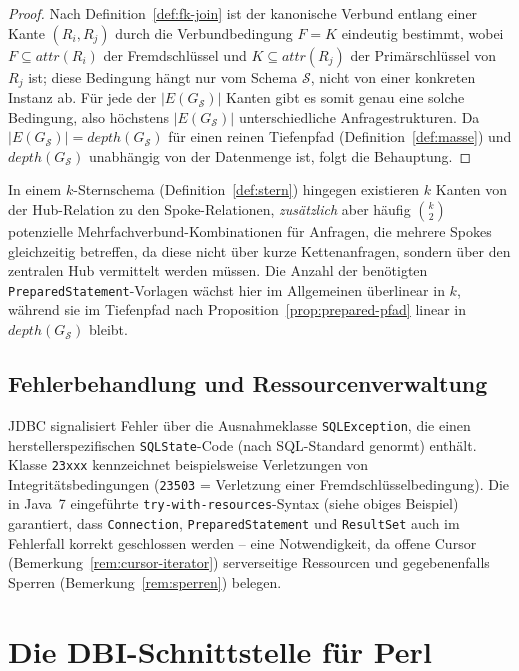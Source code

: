 ﻿\documentclass[a4paper,12pt]{report}
\theoremstyle{definition}
\theoremstyle{remark}
\newcommand{\att}{\mathit{attr}}
\newcommand{\depth}{\mathit{depth}}
\begin{document}
\begin{proof}
Nach Definition~\ref{def:fk-join} ist der kanonische Verbund entlang
einer Kante $(R_i,R_j)$ durch die Verbundbedingung $F=K$ eindeutig
bestimmt, wobei $F\subseteq\att(R_i)$ der Fremdschlüssel und
$K\subseteq\att(R_j)$ der Primärschlüssel von $R_j$ ist; diese
Bedingung hängt nur vom Schema $\mathcal{S}$, nicht von einer
konkreten Instanz ab. Für jede der $|E(G_{\mathcal{S}})|$ Kanten gibt
es somit genau eine solche Bedingung, also höchstens
$|E(G_{\mathcal{S}})|$ unterschiedliche Anfragestrukturen. Da
$|E(G_{\mathcal{S}})| = \depth(G_{\mathcal{S}})$ für einen reinen
Tiefenpfad (Definition~\ref{def:masse}) und
$\depth(G_{\mathcal{S}})$ unabhängig von der Datenmenge ist, folgt die
Behauptung. \qedhere
\end{proof}

In einem $k$-Sternschema (Definition~\ref{def:stern}) hingegen
existieren $k$ Kanten von der Hub-Relation zu den Spoke-Relationen,
\emph{zusätzlich} aber häufig $\binom{k}{2}$ potenzielle
Mehrfachverbund-Kombinationen für Anfragen, die mehrere Spokes
gleichzeitig betreffen, da diese nicht über kurze Kettenanfragen,
sondern über den zentralen Hub vermittelt werden müssen. Die Anzahl
der benötigten \texttt{PreparedStatement}-Vorlagen wächst hier im
Allgemeinen überlinear in $k$, während sie im Tiefenpfad nach
Proposition~\ref{prop:prepared-pfad} linear in $\depth(G_{\mathcal{S}})$
bleibt.

\subsection{Fehlerbehandlung und Ressourcenverwaltung}

JDBC signalisiert Fehler über die Ausnahmeklasse
\texttt{SQLException}, die einen herstellerspezifischen
\texttt{SQLState}-Code (nach SQL-Standard genormt) enthält. Klasse
\texttt{23xxx} kennzeichnet beispielsweise Verletzungen von
Integritätsbedingungen (\texttt{23503} = Verletzung einer
Fremdschlüsselbedingung). Die in Java~7 eingeführte
\texttt{try-with-resources}-Syntax (siehe obiges Beispiel) garantiert,
dass \texttt{Connection}, \texttt{PreparedStatement} und
\texttt{ResultSet} auch im Fehlerfall korrekt geschlossen werden --
eine Notwendigkeit, da offene Cursor (Bemerkung~\ref{rem:cursor-iterator})
serverseitige Ressourcen und gegebenenfalls Sperren
(Bemerkung~\ref{rem:sperren}) belegen.

\section{Die DBI-Schnittstelle für Perl}
\label{sec:perl-dbi}
\end{document}
